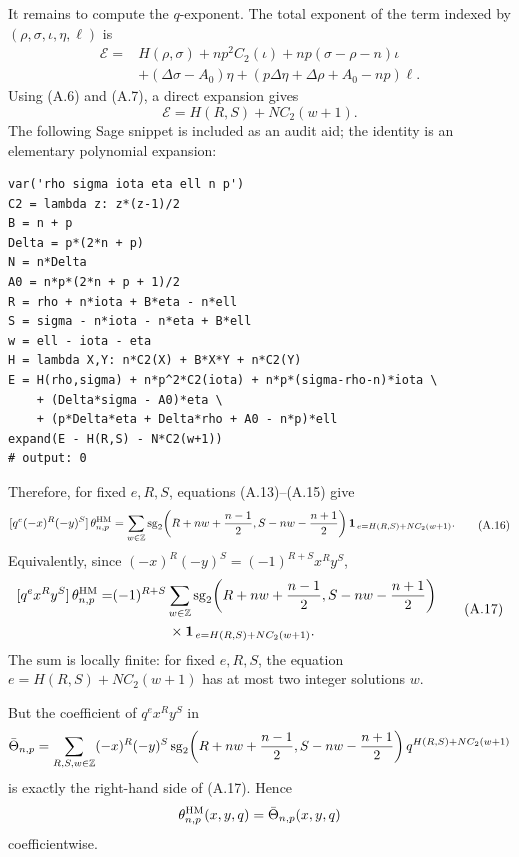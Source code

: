 It remains to compute the \(q\)-exponent.  The total exponent of the term
indexed by \((\rho,\sigma,\iota,\eta,\ell)\) is
\[
\begin{aligned}
\mathcal E
=&H(\rho,\sigma)
 +np^2C_2(\iota)+np(\sigma-\rho-n)\iota \\
&+(\Delta\sigma-A_0)\eta
 +(p\Delta\eta+\Delta\rho+A_0-np)\ell.
\end{aligned}
\tag{A.14}
\]
Using (A.6) and (A.7), a direct expansion gives
\[
  \mathcal E=H(R,S)+N C_2(w+1).
\tag{A.15}
\]
The following Sage snippet is included as an audit aid; the
identity is an elementary polynomial expansion:
\begin{verbatim}
var('rho sigma iota eta ell n p')
C2 = lambda z: z*(z-1)/2
B = n + p
Delta = p*(2*n + p)
N = n*Delta
A0 = n*p*(2*n + p + 1)/2
R = rho + n*iota + B*eta - n*ell
S = sigma - n*iota - n*eta + B*ell
w = ell - iota - eta
H = lambda X,Y: n*C2(X) + B*X*Y + n*C2(Y)
E = H(rho,sigma) + n*p^2*C2(iota) + n*p*(sigma-rho-n)*iota \
    + (Delta*sigma - A0)*eta \
    + (p*Delta*eta + Delta*rho + A0 - n*p)*ell
expand(E - H(R,S) - N*C2(w+1))
# output: 0
\end{verbatim}

Therefore, for fixed \(e,R,S\), equations (A.13)--(A.15) give
\[
\begin{aligned}
\relax[q^e(-x)^R(-y)^S]\,\theta^{\rm HM}_{n,p}
=\sum_{w\in\mathbb Z}
 \operatorname{sg}_2\!\left(R+nw+\frac{n-1}{2},
               S-nw-\frac{n+1}{2}\right)
 \mathbf 1_{\,e=H(R,S)+N C_2(w+1)}.
\end{aligned}
\tag{A.16}
\]
Equivalently, since \((-x)^R(-y)^S=(-1)^{R+S}x^Ry^S\),
\[
\begin{aligned}
\relax[q^e x^R y^S]\,\theta^{\rm HM}_{n,p}
=&(-1)^{R+S}
\sum_{w\in\mathbb Z}
 \operatorname{sg}_2\!\left(R+nw+\frac{n-1}{2},
               S-nw-\frac{n+1}{2}\right)  \\
&\qquad\qquad\times
 \mathbf 1_{\,e=H(R,S)+N C_2(w+1)}.
\end{aligned}
\tag{A.17}
\]
The sum is locally finite: for fixed \(e,R,S\), the equation
\(e=H(R,S)+N C_2(w+1)\) has at most two integer solutions \(w\).

But the coefficient of \(q^e x^R y^S\) in
\[
\bar\Theta_{n,p}
=\sum_{R,S,w\in\mathbb Z}(-x)^R(-y)^S
 \operatorname{sg}_2\!\left(R+nw+\frac{n-1}{2},
               S-nw-\frac{n+1}{2}\right)
 q^{H(R,S)+N C_2(w+1)}
\]
is exactly the right-hand side of (A.17).  Hence
\[
  \theta^{\rm HM}_{n,p}(x,y,q)=\bar\Theta_{n,p}(x,y,q)
\]
coefficientwise.
